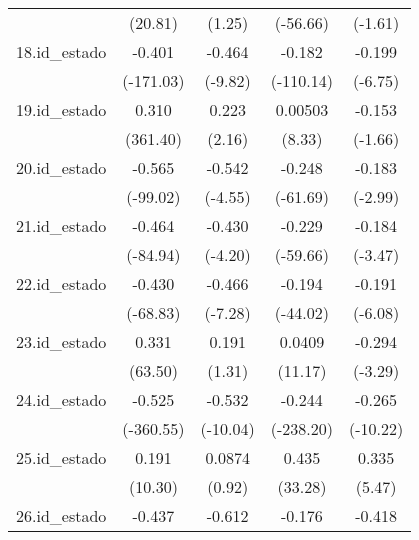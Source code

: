 {\begin{tabular}{l*{4}{c}}
            &     (20.81)         &      (1.25)         &    (-56.66)         &     (-1.61)         \\
[1em]
18.id\_estado&      -0.401\sym{***}&      -0.464\sym{***}&      -0.182\sym{***}&      -0.199\sym{***}\\
            &   (-171.03)         &     (-9.82)         &   (-110.14)         &     (-6.75)         \\
[1em]
19.id\_estado&       0.310\sym{***}&       0.223\sym{*}  &     0.00503\sym{***}&      -0.153         \\
            &    (361.40)         &      (2.16)         &      (8.33)         &     (-1.66)         \\
[1em]
20.id\_estado&      -0.565\sym{***}&      -0.542\sym{***}&      -0.248\sym{***}&      -0.183\sym{**} \\
            &    (-99.02)         &     (-4.55)         &    (-61.69)         &     (-2.99)         \\
[1em]
21.id\_estado&      -0.464\sym{***}&      -0.430\sym{***}&      -0.229\sym{***}&      -0.184\sym{**} \\
            &    (-84.94)         &     (-4.20)         &    (-59.66)         &     (-3.47)         \\
[1em]
22.id\_estado&      -0.430\sym{***}&      -0.466\sym{***}&      -0.194\sym{***}&      -0.191\sym{***}\\
            &    (-68.83)         &     (-7.28)         &    (-44.02)         &     (-6.08)         \\
[1em]
23.id\_estado&       0.331\sym{***}&       0.191         &      0.0409\sym{***}&      -0.294\sym{**} \\
            &     (63.50)         &      (1.31)         &     (11.17)         &     (-3.29)         \\
[1em]
24.id\_estado&      -0.525\sym{***}&      -0.532\sym{***}&      -0.244\sym{***}&      -0.265\sym{***}\\
            &   (-360.55)         &    (-10.04)         &   (-238.20)         &    (-10.22)         \\
[1em]
25.id\_estado&       0.191\sym{***}&      0.0874         &       0.435\sym{***}&       0.335\sym{***}\\
            &     (10.30)         &      (0.92)         &     (33.28)         &      (5.47)         \\
[1em]
26.id\_estado&      -0.437\sym{***}&      -0.612\sym{**} &      -0.176\sym{***}&      -0.418\sym{*}  \\

\end{tabular}}
